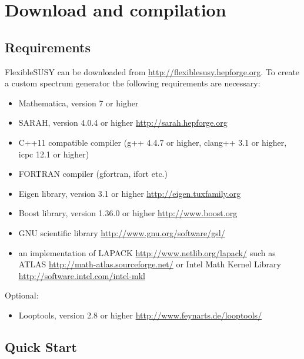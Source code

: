 \documentclass[final,3p,11pt,pdflatex]{elsarticle}
\makeatletter
\newcommand{\fs}{FlexibleSUSY\@\xspace}
\newcommand{\mathematica}{Mathematica\xspace}
\makeatother
\begin{document}
\section{Download and compilation}
\label{Sec:download}

\subsection{Requirements}

\fs can be downloaded from \url{http://flexiblesusy.hepforge.org}.  To
create a custom spectrum generator the following requirements are
necessary:
%
\begin{itemize}
\item \mathematica, version 7 or higher
\item SARAH, version 4.0.4 or higher \url{http://sarah.hepforge.org}
\item C++11 compatible compiler (g++ 4.4.7 or higher, clang++ 3.1 or
  higher, icpc 12.1 or higher)
\item FORTRAN compiler (gfortran, ifort etc.)
\item Eigen library, version 3.1 or higher
  \url{http://eigen.tuxfamily.org}
\item Boost library, version 1.36.0 or higher
  \url{http://www.boost.org}
\item GNU scientific library \url{http://www.gnu.org/software/gsl/}
\item an implementation of LAPACK \url{http://www.netlib.org/lapack/}
  such as ATLAS \url{http://math-atlas.sourceforge.net/} or
  Intel Math Kernel Library \url{http://software.intel.com/intel-mkl}
\end{itemize}
%
Optional:
%
\begin{itemize}
\item Looptools, version 2.8 or higher
  \url{http://www.feynarts.de/looptools/}
\end{itemize}

\subsection{Quick Start}
\end{document}
